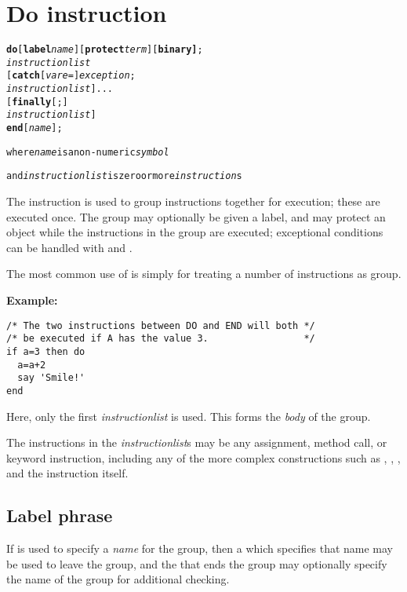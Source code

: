 \section{Do instruction}\label{refdo}
\begin{shaded}
\begin{alltt}
\textbf{do} [\textbf{label} \emph{name}] [\textbf{protect} \emph{term}] [\textbf{binary]};
        \emph{instructionlist}
    [\textbf{catch} [\emph{vare} =] \emph{exception};
        \emph{instructionlist}]...
    [\textbf{finally}[;]
        \emph{instructionlist}]
\textbf{end} [\emph{name}];

where \emph{name} is a non-numeric \emph{symbol}

and \emph{instructionlist} is zero or more \emph{instruction}s
\end{alltt}
\end{shaded}
 The  instruction is used to group instructions together for
execution; these are executed once.
The group may optionally be given a label, and may protect an object
while the instructions in the group are executed; exceptional conditions
can be handled with  and .
 
The most common use of  is simply for treating a number of
instructions as group.

\textbf{Example:}
\begin{lstlisting}
/* The two instructions between DO and END will both */
/* be executed if A has the value 3.                 */
if a=3 then do
  a=a+2
  say 'Smile!'
end
\end{lstlisting}
Here, only the first \emph{instructionlist} is used.
This forms the \emph{body} of the group.
 
The instructions in the \emph{instructionlist}s may be any assignment,
method call, or keyword instruction, including any of the more complex
constructions such as , , , and
the  instruction itself.
\subsection{Label phrase}
 
If  is used to specify a \emph{name} for the group,
then a  which specifies that name may be used to leave the
group, and the  that ends the group may optionally specify
the name of the group for additional checking.

